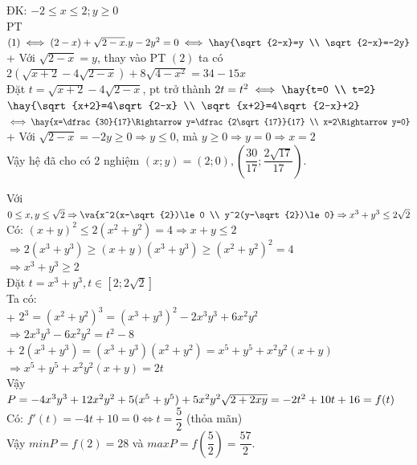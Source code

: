 \lgi 
\vspace{5cm}

\hda 
ĐK: $-2\le x\le 2;y\ge 0$\\
PT $(1)\iff (2-x)+\sqrt{2-x}.y-2y^2=0\iff \hay{\sqrt{2-x}=y \\ \sqrt{2-x}=-2y}$\\
+ Với $\sqrt{2-x}=y$, thay vào PT $(2)$ ta có $2\left ( \sqrt{x+2}-4\sqrt{2-x}\right)+8\sqrt{4-x^2}=34-15x$\\
Đặt $t=\sqrt{x+2}-4\sqrt{2-x}$, pt trở thành $2t=t^2\iff \hay{t=0 \\ t=2}$\\
$\hay{\sqrt{x+2}=4\sqrt{2-x} \\ \sqrt{x+2}=4\sqrt{2-x}+2}$\\
$\iff \hay{x=\dfrac{30}{17}\Rightarrow y=\dfrac{2\sqrt{17}}{17} \\ x=2\Rightarrow y=0}$\\
+ Với $\sqrt{2-x}=-2y\ge 0\Rightarrow y\le 0$, mà $y\ge 0\Rightarrow y=0\Rightarrow x=2$\\
Vậy hệ đã cho có 2 nghiệm $(x;y)=(2;0),\left( \dfrac{30}{17}; \dfrac{2\sqrt{17}}{17}\right)$.

\hda 
Với $0\le x,y\le \sqrt{2}\Rightarrow \va{x^2(x-\sqrt{2})\le 0 \\ y^2(y-\sqrt{2})\le 0}\Rightarrow x^3+y^3\le 2\sqrt{2}$\\
Có: $(x+y)^2\le 2(x^2+y^2)=4\Rightarrow x+y\le 2$\\
$\Rightarrow 2(x^3+y^3)\ge (x+y)(x^3+y^3)\ge (x^2+y^2)^2=4$\\
$\Rightarrow x^3+y^3\ge 2$\\
Đặt $t=x^3+y^3, t\in [2;2\sqrt{2}]$\\
Ta có:\\
+ $2^3=(x^2+y^2)^3=(x^3+y^3)^2-2x^3y^3+6x^2y^2$\\
$\Rightarrow 2x^3y^3-6x^2y^2=t^2-8$\\
+ $2(x^3+y^3)=(x^3+y^3)(x^2+y^2)=x^5+y^5+x^2y^2(x+y)$\\
$\Rightarrow x^5+y^5+x^2y^2(x+y)=2t$\\
Vậy $P=-4x^3y^3+12x^2y^2+5(x^5+y^5)+5x^2y^2\sqrt{2+2xy}\\
=-2t^2+10t+16=f(t)$\\
Có: $f'(t)=-4t+10=0\iff t=\dfrac{5}{2}$ (thỏa mãn)\\
Vậy $minP=f(2)=28$ và $maxP=f\left(\dfrac{5}{2}\right)=\dfrac{57}{2}$.

